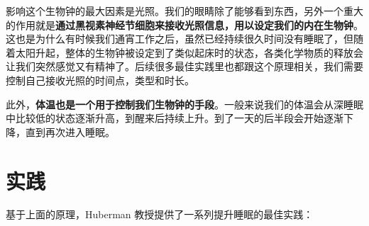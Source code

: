 \documentclass{report}
\begin{document}
影响这个生物钟的最大因素是光照。我们的眼睛除了能够看到东西，另外一个重大的作用就是\textbf{通过黑视素神经节细胞来接收光照信息，用以设定我们的内在生物钟}。这也是为什么有时候我们通宵工作之后，虽然已经持续很久时间没有睡眠了，但随着太阳升起，整体的生物钟被设定到了类似起床时的状态，各类化学物质的释放会让我们突然感觉又有精神了。后续很多最佳实践里也都跟这个原理相关，我们需要控制自己接收光照的时间点，类型和时长。

此外，\textbf{体温也是一个用于控制我们生物钟的手段}。一般来说我们的体温会从深睡眠中比较低的状态逐渐升高，到醒来后持续上升。到了一天的后半段会开始逐渐下降，直到再次进入睡眠。

\section{实践}

基于上面的原理，Huberman 教授提供了一系列提升睡眠的最佳实践：
\end{document}
